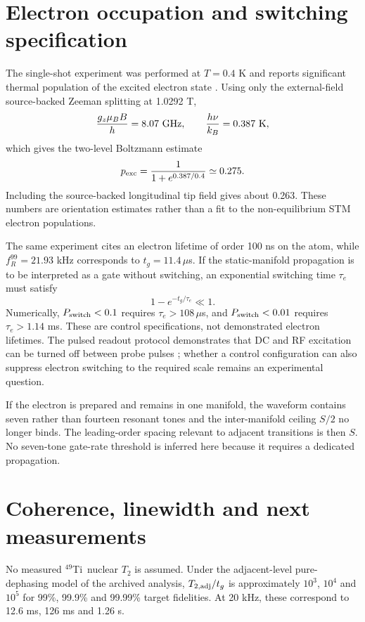 \documentclass[11pt]{article}
\newcommand{\Ti}{$^{49}$Ti}
\newcommand{\fR}{f_R}
\begin{document}
\section{Electron occupation and switching specification}
The single-shot experiment was performed at $T=0.4$ K and reports significant thermal population of the excited electron state \cite{stolte2025}. Using only the external-field source-backed Zeeman splitting at 1.0292 T,
\begin{equation}
\frac{g_z\mu_BB}{h}=8.07\ {\rm GHz},\qquad \frac{h\nu}{k_B}=0.387\ {\rm K},
\end{equation}
which gives the two-level Boltzmann estimate
\begin{equation}
p_{\rm exc}=\frac{1}{1+e^{0.387/0.4}}\simeq0.275.
\end{equation}
Including the source-backed longitudinal tip field gives about 0.263. These numbers are orientation estimates rather than a fit to the non-equilibrium STM electron populations.

The same experiment cites an electron lifetime of order 100 ns on the atom, while $\fR^{99}=21.93$ kHz corresponds to $t_g=11.4\,\mu$s. If the static-manifold propagation is to be interpreted as a gate without switching, an exponential switching time $\tau_e$ must satisfy
\begin{equation}
1-e^{-t_g/\tau_e}\ll1.
\end{equation}
Numerically, $P_{\rm switch}<0.1$ requires $\tau_e>108\,\mu$s, and $P_{\rm switch}<0.01$ requires $\tau_e>1.14$ ms. These are control specifications, not demonstrated electron lifetimes. The pulsed readout protocol demonstrates that DC and RF excitation can be turned off between probe pulses \cite{stolte2025}; whether a control configuration can also suppress electron switching to the required scale remains an experimental question.

If the electron is prepared and remains in one manifold, the waveform contains seven rather than fourteen resonant tones and the inter-manifold ceiling $S/2$ no longer binds. The leading-order spacing relevant to adjacent transitions is then $S$. No seven-tone gate-rate threshold is inferred here because it requires a dedicated propagation.

\section{Coherence, linewidth and next measurements}
No measured \Ti\ nuclear $T_2$ is assumed. Under the adjacent-level pure-dephasing model of the archived analysis, $T_{2,{\rm adj}}/t_g$ is approximately $10^3$, $10^4$ and $10^5$ for 99\%, 99.9\% and 99.99\% target fidelities. At 20 kHz, these correspond to 12.6 ms, 126 ms and 1.26 s.
\end{document}
